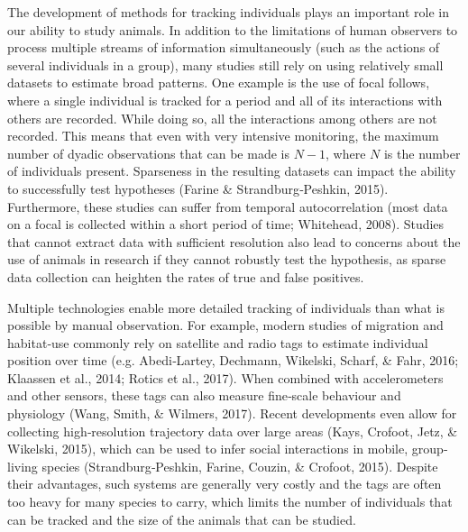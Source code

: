 \documentclass[11pt,a4paper,oneside]{book}
\begin{document}
\begin{doublespace}
    The development of methods for tracking individuals plays an important role in our ability to study animals. In addition to the limitations of human observers to process multiple streams of information simultaneously (such as the actions of several individuals in a group), many studies still rely on using relatively small datasets to estimate broad patterns. One example is the use of focal follows, where a single individual is tracked for a period and all of its interactions with others are recorded. While doing so, all the interactions among others are not recorded. This means that even with very intensive monitoring, the maximum number of dyadic observations that can be made is $N - 1$, where $N$ is the number of individuals present. Sparseness in the resulting datasets can impact the ability to successfully test hypotheses (Farine & Strandburg‐Peshkin, 2015). Furthermore, these studies can suffer from temporal autocorrelation (most data on a focal is collected within a short period of time; Whitehead, 2008). Studies that cannot extract data with sufficient resolution also lead to concerns about the use of animals in research if they cannot robustly test the hypothesis, as sparse data collection can heighten the rates of true and false positives.
    
    Multiple technologies enable more detailed tracking of individuals than what is possible by manual observation. For example, modern studies of migration and habitat‐use commonly rely on satellite and radio tags to estimate individual position over time (e.g. Abedi‐Lartey, Dechmann, Wikelski, Scharf, \& Fahr, 2016; Klaassen et al., 2014; Rotics et al., 2017). When combined with accelerometers and other sensors, these tags can also measure fine‐scale behaviour and physiology (Wang, Smith, \& Wilmers, 2017). Recent developments even allow for collecting high‐resolution trajectory data over large areas (Kays, Crofoot, Jetz, \& Wikelski, 2015), which can be used to infer social interactions in mobile, group‐living species (Strandburg‐Peshkin, Farine, Couzin, \& Crofoot, 2015). Despite their advantages, such systems are generally very costly and the tags are often too heavy for many species to carry, which limits the number of individuals that can be tracked and the size of the animals that can be studied.
    

\end{doublespace}
\end{document}
